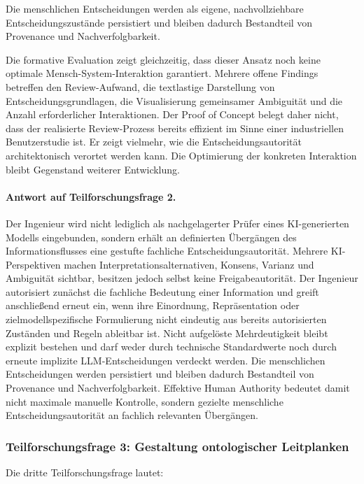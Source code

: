 Die menschlichen Entscheidungen werden als eigene, nachvollziehbare
Entscheidungszustände persistiert und bleiben dadurch Bestandteil von
Provenance und Nachverfolgbarkeit.

Die formative Evaluation zeigt gleichzeitig, dass dieser Ansatz noch keine
optimale Mensch-System-Interaktion garantiert. Mehrere offene Findings
betreffen den Review-Aufwand, die textlastige Darstellung von
Entscheidungsgrundlagen, die Visualisierung gemeinsamer Ambiguität und die
Anzahl erforderlicher Interaktionen. Der Proof of Concept belegt daher nicht,
dass der realisierte Review-Prozess bereits effizient im Sinne einer
industriellen Benutzerstudie ist. Er zeigt vielmehr, wie die
Entscheidungsautorität architektonisch verortet werden kann. Die Optimierung
der konkreten Interaktion bleibt Gegenstand weiterer Entwicklung.

\paragraph{Antwort auf Teilforschungsfrage 2.}

Der Ingenieur wird nicht lediglich als nachgelagerter Prüfer eines
KI-generierten Modells eingebunden, sondern erhält an definierten Übergängen
des Informationsflusses eine gestufte fachliche Entscheidungsautorität.
Mehrere KI-Perspektiven machen Interpretationsalternativen, Konsens, Varianz
und Ambiguität sichtbar, besitzen jedoch selbst keine Freigabeautorität. Der
Ingenieur autorisiert zunächst die fachliche Bedeutung einer Information und
greift anschließend erneut ein, wenn ihre Einordnung, Repräsentation oder
zielmodellspezifische Formulierung nicht eindeutig aus bereits autorisierten
Zuständen und Regeln ableitbar ist. Nicht aufgelöste Mehrdeutigkeit bleibt
explizit bestehen und darf weder durch technische Standardwerte noch durch
erneute implizite LLM-Entscheidungen verdeckt werden. Die menschlichen
Entscheidungen werden persistiert und bleiben dadurch Bestandteil von
Provenance und Nachverfolgbarkeit. Effektive Human Authority bedeutet damit
nicht maximale manuelle Kontrolle, sondern gezielte menschliche
Entscheidungsautorität an fachlich relevanten Übergängen.

\subsubsection{Teilforschungsfrage 3: Gestaltung ontologischer Leitplanken}
\label{sec:discussion_rq3}

Die dritte Teilforschungsfrage lautet:

